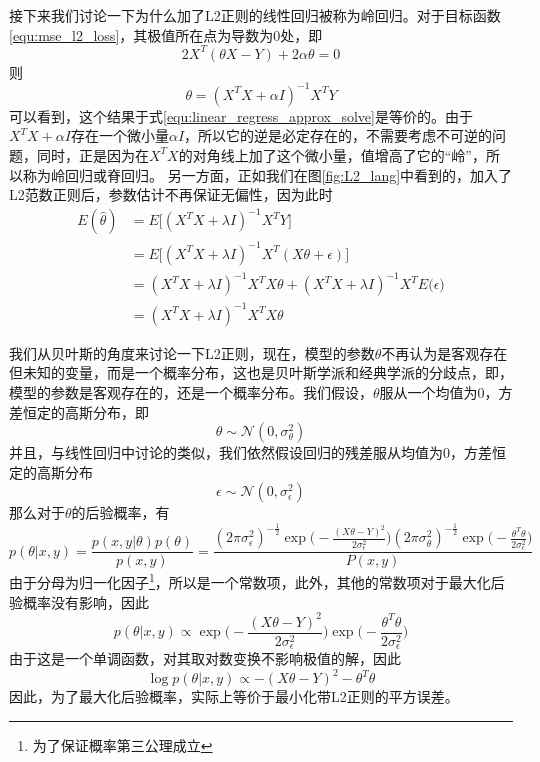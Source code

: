 接下来我们讨论一下为什么加了L2正则的线性回归被称为岭回归。对于目标函数\ref{equ:mse_l2_loss}，其极值所在点为导数为0处，即
\begin{equation}
	2X^T(\theta X - Y) + 2\alpha\theta = 0
\end{equation}
则
\begin{equation}
	\theta = (X^TX + \alpha I)^{-1}X^TY
\end{equation}
可以看到，这个结果于式\ref{equ:linear_regress_approx_solve}是等价的。由于$X^TX + \alpha I$存在一个微小量$\alpha I$，所以它的逆是必定存在的，不需要考虑不可逆的问题，同时，正是因为在$X^TX$的对角线上加了这个微小量，值增高了它的“岭”，所以称为岭回归或脊回归。 另一方面，正如我们在图\ref{fig:L2_lang}中看到的，加入了L2范数正则后，参数估计不再保证无偏性，因为此时
\begin{equation}
\begin{split}
E(\hat{\theta}) &=E\big[(X^TX + \lambda I)^{-1}X^TY\big]\\
&=E\big[(X^TX + \lambda I)^{-1}X^T(X\theta + \epsilon)\big]\\
&=(X^TX + \lambda I)^{-1}X^TX\theta 
	+  (X^TX + \lambda I)^{-1}X^T E\big(\epsilon)\\
&=(X^TX + \lambda I)^{-1}X^TX\theta 
 \end{split}
\end{equation}

我们从贝叶斯的角度来讨论一下L2正则，现在，模型的参数$\theta$不再认为是客观存在但未知的变量，而是一个概率分布，这也是贝叶斯学派和经典学派的分歧点，即，模型的参数是客观存在的，还是一个概率分布。我们假设，$\theta$服从一个均值为0，方差恒定的高斯分布，即
\begin{equation}
	\theta \sim \mathcal{N}(0, \sigma_\theta^2)
\end{equation}
并且，与线性回归中讨论的类似，我们依然假设回归的残差服从均值为0，方差恒定的高斯分布
\begin{equation}
	\epsilon \sim \mathcal{N}(0, \sigma_\epsilon^2)
\end{equation}
那么对于$\theta$的后验概率，有
\begin{equation}
	p(\theta|x, y) = \frac{p(x, y| \theta)p(\theta)}{p(x, y)} 
	= \frac{(2\pi\sigma_\epsilon^2)^{-\frac{1}{2}}\exp\Big(-\frac{(X\theta - Y)^2}{2\sigma_\epsilon^2}\Big)
	(2\pi\sigma_\theta^2)^{-\frac{1}{2}}\exp\Big(-\frac{\theta^T\theta}{2\sigma_\epsilon^2}\Big)
	}{P(x, y)}
\end{equation}
由于分母为归一化因子\footnote{为了保证概率第三公理成立}，所以是一个常数项，此外，其他的常数项对于最大化后验概率没有影响，因此
\begin{equation}
	p(\theta|x, y) \propto
	\exp\Big(-\frac{(X\theta - Y)^2}{2\sigma_\epsilon^2}\Big)
	\exp\Big(-\frac{\theta^T\theta}{2\sigma_\epsilon^2}\Big)
\end{equation}
由于这是一个单调函数，对其取对数变换不影响极值的解，因此
\begin{equation}
	\log p(\theta|x, y) \propto
	-(X\theta - Y)^2
	-\theta^T\theta
\end{equation}
因此，为了最大化后验概率，实际上等价于最小化带L2正则的平方误差。

